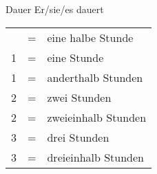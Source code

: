 \begin{semantics}{Dauer}{}
Er/sie/es dauert \fillhere

\begin{mdframed}
\begin{tabular}{lll}
	\textonehalf	& = & eine halbe Stunde \\
	1				& = & eine Stunde \\
	1\textonehalf	& = & anderthalb Stunden \\
	2				& = & zwei Stunden \\
	2\textonehalf	& = & zweieinhalb Stunden \\
	3				& = & drei Stunden \\
	3\textonehalf	& = & dreieinhalb Stunden
\end{tabular}
\end{mdframed}
\end{semantics}

